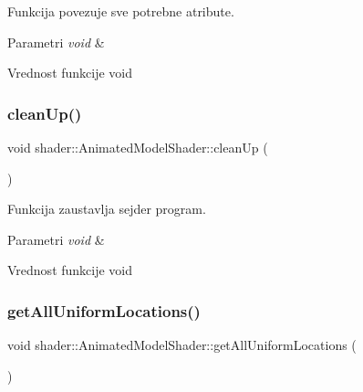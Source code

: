 Funkcija povezuje sve potrebne atribute. 


\begin{DoxyParams}{Parametri}
{\em void} & \\
\hline
\end{DoxyParams}
\begin{DoxyReturn}{Vrednost funkcije}
void 
\end{DoxyReturn}
\mbox{\label{classshader_1_1AnimatedModelShader_a9b7ce34a85b989b6468eaa1efe1a3928}} 
\subsubsection{\texorpdfstring{clean\+Up()}{cleanUp()}}
{\footnotesize\ttfamily void shader\+::\+Animated\+Model\+Shader\+::clean\+Up (\begin{DoxyParamCaption}\item[{void}]{ }\end{DoxyParamCaption})}



Funkcija zaustavlja sejder program. 


\begin{DoxyParams}{Parametri}
{\em void} & \\
\hline
\end{DoxyParams}
\begin{DoxyReturn}{Vrednost funkcije}
void 
\end{DoxyReturn}
\mbox{\label{classshader_1_1AnimatedModelShader_a41de54497f81f6781a11730041b23051}} 
\subsubsection{\texorpdfstring{get\+All\+Uniform\+Locations()}{getAllUniformLocations()}}
{\footnotesize\ttfamily void shader\+::\+Animated\+Model\+Shader\+::get\+All\+Uniform\+Locations (\begin{DoxyParamCaption}\item[{void}]{ }\end{DoxyParamCaption})}



